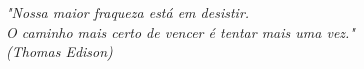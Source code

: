 \begin{epigrafe}
    \vspace*{\fill}
	\begin{flushright}
	\textit{"Nossa maior fraqueza está em desistir. \\
	O caminho mais certo de vencer é tentar mais uma vez." \\
				(Thomas Edison)					
	}	
	

	\end{flushright}
\end{epigrafe}

